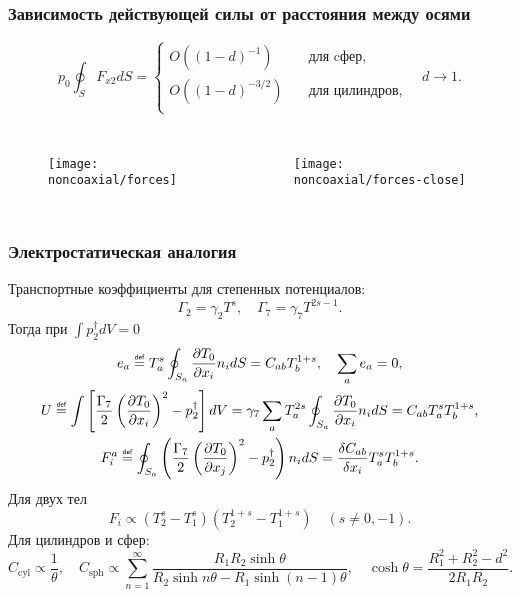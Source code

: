 \documentclass[mathserif]{beamer} %
\newcommand{\eqdef}{\mathrel{\overset{\makebox[0pt]{\mbox{\normalfont\tiny\sffamily def}}}{=}}}
\newcommand{\dd}{d}%
\newcommand{\pder}[2][]{\frac{\partial#1}{\partial#2}}
\newcommand{\OO}[1]{O(#1)}
\begin{document}
\begin{frame}
    \frametitle{Зависимость действующей силы от расстояния между осями}
    \vspace{-.5cm}
    \[ p_0 \oint_S F_{x2}\dd{S} = \begin{cases}
        \OO{(1-d)^{-1}} & \quad\text{для cфер}, \\
        \OO{(1-d)^{-3/2}} & \quad\text{для цилиндров}, \\
        \end{cases} \quad d\to1. \]
    \vspace{-.7cm}
    \begin{columns}
        \begin{figure}
            \texttt{[image: noncoaxial/forces]}
        \end{figure}
        \begin{figure}
            \texttt{[image: noncoaxial/forces-close]}
        \end{figure}
    \end{columns}
\end{frame}

\begin{frame}
    \frametitle{Электростатическая аналогия}
    \footnotesize
    Транспортные коэффициенты для степенных потенциалов:
    \begin{equation*}\label{eq:gammas}
        \Gamma_2 = \gamma_2 T^s, \quad \Gamma_7 = \gamma_7 T^{2s-1}.
    \end{equation*}
    Тогда при \(\int p_2^\dag\dd{V} = 0\)
    \begin{gather*}
        e_a \eqdef T_a^s \oint_{S_a} \pder[T_0]{x_i}n_i\dd{S} = C_{ab} T_b^{1+s}, \quad \sum_a e_a = 0, \\
        U \eqdef \int \left[ \frac{\Gamma_7}2\left(\pder[T_0]{x_i}\right)^2 - p_2^\dag \right]\dd{V} =
        \gamma_7 \sum_a T_a^{2s} \oint_{S_a} \pder[T_0]{x_i}n_i\dd{S} = C_{ab} T_a^s T_b^{1+s}, \\
        F^a_i \eqdef \oint_{S_a} \left( \frac{\Gamma_7}{2}\left(\pder[T_0]{x_j}\right)^2 - p_2^\dag \right) n_i\dd{S}
            = \frac{\delta C_{ab}}{\delta x_i} T_a^s T_b^{1+s}.
    \end{gather*}
    Для двух тел
    \begin{equation*}
        F_i \propto \left( T_2^s - T_1^s \right)\left( T_2^{1+s} - T_1^{1+s} \right) \quad (s\neq0,-1).
    \end{equation*}
    Для цилиндров и сфер:
    \begin{equation*}
        C_\mathrm{cyl} \propto \frac1{\theta}, \quad
        C_\mathrm{sph} \propto  \sum_{n=1}^\infty \frac{R_1 R_2 \sinh\theta} {R_2\sinh n\theta - R_1\sinh (n-1)\theta},
        \quad \cosh\theta = \frac{R_1^2 + R_2^2 - d^2}{2 R_1 R_2}.
    \end{equation*}
\end{frame}
\end{document}
